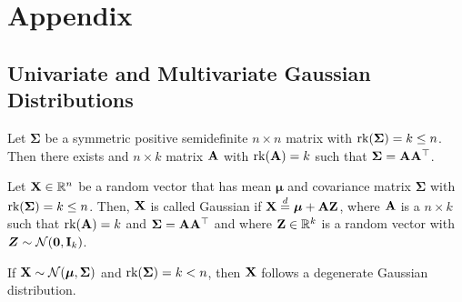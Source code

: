 \chapter{Appendix}
\section{Univariate and Multivariate Gaussian Distributions}

\begin{proposition}
	Let ${\bm \Sigma}$ be a symmetric positive semidefinite $n \times n$ matrix with $\operatorname{rk} \mleft( {\bm \Sigma} \mright) = k \leq n$. Then there exists and $n \times k$ matrix ${\bf A}$ with $\operatorname{rk} \mleft( {\bf A} \mright) = k$ such that ${\bm \Sigma} = {\bf A} {\bf A}^{\top}$.
\end{proposition}

\begin{definition}
	Let ${\bf X} \in \mathbb{R}^n$ be a random vector that has mean ${\bm \mu}$ and covariance matrix ${\bm \Sigma}$ with $\text{rk} \mleft( {\bm \Sigma} \mright) = k \leq n$. Then, ${\bf X}$ is called Gaussian if ${\bf X} \overset{d}{=} {\bm \mu} + {\bf A} {\bf Z}$, where ${\bf A}$ is a $n \times k$ such that $\operatorname{rk} \mleft( {\bf A} \mright) = k$ and ${\bm \Sigma} = {\bf A} {\bf A}^{\top}$ and where ${\bf Z} \in \mathbb{R}^k$ is a random vector with ${\bm Z} \sim \mathcal{N} \mleft( {\bf 0}, {\bf I}_k \mright)$.
\end{definition}

\begin{definition}
	If ${\bf X} \sim \mathcal{N} \mleft( {\bm \mu}, {\bm \Sigma} \mright)$ and $\text{rk} \mleft( {\bm \Sigma} \mright) = k < n$, then ${\bf X}$ follows a degenerate Gaussian distribution.
\end{definition}

